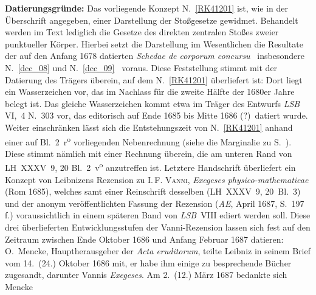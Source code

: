 \begin{ledgroup}%
\footnotesize%
\pstart%
\noindent%
\textbf{Datierungsgründe:}
Das vorliegende Konzept N.~\ref{RK41201} %
ist, wie in der Überschrift angegeben, einer Darstellung der Stoßgesetze gewidmet.
Behandelt werden im Text %
lediglich die Gesetze des direkten zentralen Stoßes zweier punktueller Körper.
Hierbei setzt die Darstellung im Wesentlichen die Resultate der auf den Anfang 1678 datierten \textit{Schedae de corporum concursu} \textendash\ insbesondere N.~\ref{dcc_08} %
und N.~\ref{dcc_09} %
\textendash\ voraus.
Diese Feststellung stimmt mit der Datierung des Trägers überein, auf dem N.~\ref{RK41201} %
überliefert ist:
Dort liegt ein Wasserzeichen vor, das im Nachlass für die zweite Hälfte der 1680er Jahre belegt ist.
Das gleiche Wasserzeichen kommt etwa im Träger des Entwurfs \textit{LSB} VI,~4 N.~303\cite{01355} vor, das editorisch auf \glqq Ende 1685 bis Mitte 1686 (?)\grqq\ datiert wurde.
\pend
\pstart
Weiter einschränken lässt sich die Entstehungszeit von N.~\ref{RK41201} %
anhand einer auf Bl.~2~r\textsuperscript{o} vorliegenden Nebenrechnung (siehe die Marginalie zu S.~).
Diese stimmt nämlich mit einer Rechnung überein, die am unteren Rand von LH~XXXV~9, 20 Bl.~2~v\textsuperscript{o} anzutreffen ist.
Letztere Handschrift überliefert ein Konzept von Leibnizens Rezension zu \protect{}I.\,F. \textsc{Vanni}, \cite{02000}\textit{Exegeses physico-mathematicae} (Rom 1685), welches samt einer Reinschrift desselben (LH~XXXV~9, 20~Bl.~3) und der anonym veröffentlichten Fassung der Rezension (\cite{01023}\textit{AE}, April 1687, S.~197\,f.) voraussichtlich in einem späteren Band von \textit{LSB}~VIII ediert werden soll.
Diese drei überlieferten Entwicklungsstufen der Vanni-Rezension lassen sich fest auf den Zeitraum zwischen Ende Oktober 1686 und Anfang Februar 1687 datieren:
O.~Mencke,%
\protect{}
Hauptherausgeber der \textit{Acta eruditorum}, 
teilte Leibniz in seinem \cite{02013}Brief vom 14.~(24.) Oktober 1686 mit, er habe ihm einige zu besprechende Bücher zugesandt, darunter Vannis \textit{Exegeses}.\cite{02000}%
\protect{}
Am 2.~(12.) März 1687\cite{02014} bedankte sich Mencke%
\protect{}

\end{ledgroup}
